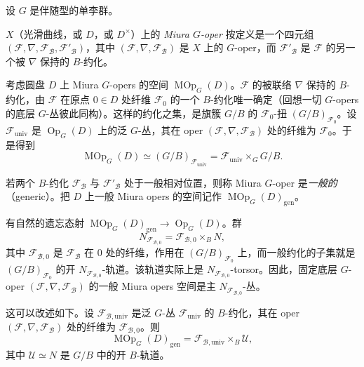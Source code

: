设 $G$ 是伴随型的单李群。

$X$（光滑曲线，或 $D$，或 $D^\times$）上的 \emph{Miura $G$-oper} 按定义是一个四元组 $(\mathcal F,\nabla,\mathcal F_{\mathcal B},\mathcal F'_{\mathcal B})$，其中 $(\mathcal F,\nabla,\mathcal F_{\mathcal B})$ 是 $X$ 上的 $G$-oper，而 $\mathcal F'_{\mathcal B}$ 是 $\mathcal F$ 的另一个被 $\nabla$ 保持的 $B$-约化。

考虑圆盘 $D$ 上 Miura $G$-opers 的空间 $\operatorname{MOp}_G(D)$。$\mathcal F$ 的被联络 $\nabla$ 保持的 $B$-约化，由 $\mathcal F$ 在原点 $0\in D$ 处纤维 $\mathcal F_0$ 的一个 $B$-约化唯一确定（回想一切 $G$-opers 的底层 $G$-丛彼此同构）。这样的约化之集，是旗簇 $G/B$ 的 $\mathcal F_0$-扭 $(G/B)_{\mathcal F_0}$。设 $\mathcal F_{\mathrm{univ}}$ 是 $\operatorname{Op}_G(D)$ 上的泛 $G$-丛，其在 oper $(\mathcal F,\nabla,\mathcal F_{\mathcal B})$ 处的纤维为 $\mathcal F_0$。于是得到
\[
    \operatorname{MOp}_G(D)\simeq(G/B)_{\mathcal F_{\mathrm{univ}}}=\mathcal F_{\mathrm{univ}}\times_G G/B.
\]

若两个 $B$-约化 $\mathcal F_{\mathcal B}$ 与 $\mathcal F'_{\mathcal B}$ 处于一般相对位置，则称 Miura $G$-oper 是\emph{一般的}（generic）。把 $D$ 上一般 Miura opers 的空间记作 $\operatorname{MOp}_G(D)_{\mathrm{gen}}$。

有自然的遗忘态射 $\operatorname{MOp}_G(D)_{\mathrm{gen}}\to\operatorname{Op}_G(D)$。群
\[
    N_{\mathcal F_{\mathcal B,0}}=\mathcal F_{\mathcal B,0}\times_B N,
\]
其中 $\mathcal F_{\mathcal B,0}$ 是 $\mathcal F_{\mathcal B}$ 在 $0$ 处的纤维，作用在 $(G/B)_{\mathcal F_0}$ 上，而一般约化的子集就是 $(G/B)_{\mathcal F_0}$ 的开 $N_{\mathcal F_{\mathcal B,0}}$-轨道。该轨道实际上是 $N_{\mathcal F_{\mathcal B,0}}$-torsor。因此，固定底层 $G$-oper $(\mathcal F,\nabla,\mathcal F_{\mathcal B})$ 的一般 Miura opers 空间是主 $N_{\mathcal F_{\mathcal B,0}}$-丛。

这可以改述如下。设 $\mathcal F_{\mathcal B,\mathrm{univ}}$ 是泛 $G$-丛 $\mathcal F_{\mathrm{univ}}$ 的 $B$-约化，其在 oper $(\mathcal F,\nabla,\mathcal F_{\mathcal B})$ 处的纤维为 $\mathcal F_{\mathcal B,0}$。则
\begin{equation}
    \operatorname{MOp}_G(D)_{\mathrm{gen}}=\mathcal F_{\mathcal B,\mathrm{univ}}\times_B\mathcal U,
    \tag{8.2-1}
\end{equation}
其中 $\mathcal U\simeq N$ 是 $G/B$ 中的开 $B$-轨道。

